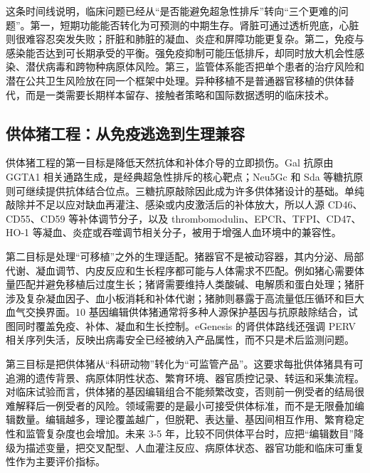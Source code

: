 \documentclass[
  chinese,
  11pt,a4paper]{article}
\begin{document}
这条时间线说明，临床问题已经从``是否能避免超急性排斥''转向``三个更难的问题''。第一，短期功能能否转化为可预测的中期生存。肾脏可通过透析兜底，心脏则很难容忍突发失败；肝脏和肺脏的凝血、炎症和屏障功能更复杂。第二，免疫与感染能否达到可长期承受的平衡。强免疫抑制可能压低排斥，却同时放大机会性感染、潜伏病毒和跨物种病原体风险。第三，监管体系能否把单个患者的治疗风险和潜在公共卫生风险放在同一个框架中处理。异种移植不是普通器官移植的供体替代，而是一类需要长期样本留存、接触者策略和国际数据透明的临床技术\citep{internationalxenotransplantationassociat2, internationalxenotransplantationassociat3}。

\subsection{供体猪工程：从免疫逃逸到生理兼容}\label{ux4f9bux4f53ux732aux5de5ux7a0bux4eceux514dux75abux9003ux9038ux5230ux751fux7406ux517cux5bb9}

供体猪工程的第一目标是降低天然抗体和补体介导的立即损伤。Gal 抗原由 GGTA1
相关通路生成，是经典超急性排斥的核心靶点；Neu5Gc 和 Sda
等糖抗原则可继续提供抗体结合位点。三糖抗原敲除因此成为许多供体猪设计的基础。单纯敲除并不足以应对缺血再灌注、感染或内皮激活后的补体放大，所以人源
CD46、CD55、CD59 等补体调节分子，以及
thrombomodulin、EPCR、TFPI、CD47、HO-1
等凝血、炎症或吞噬调节相关分子，被用于增强人血环境中的兼容性\citep{whatgeneticmodifications2024, geneticengineeringof2022, immunobiologicalbarriersto2023}。

第二目标是处理``可移植''之外的生理适配。猪器官不是被动容器，其内分泌、局部代谢、凝血调节、内皮反应和生长程序都可能与人体需求不匹配。例如猪心需要体量匹配并避免移植后过度生长；猪肾需要维持人类酸碱、电解质和蛋白处理；猪肝涉及复杂凝血因子、血小板消耗和补体代谢；猪肺则暴露于高流量低压循环和巨大血气交换界面。10
基因编辑供体猪通常将多种人源保护基因与抗原敲除结合，试图同时覆盖免疫、补体、凝血和生长控制\citep{specificpathogenfree20251, geneticallyengineeredpig2025}。eGenesis
的肾供体路线还强调 PERV
相关序列失活，反映出病毒安全已经被纳入产品属性，而不只是术后监测问题\citep{egenesis2025egen2784ind}。

第三目标是把供体猪从``科研动物''转化为``可监管产品''。这要求每批供体猪具有可追溯的遗传背景、病原体阴性状态、繁育环境、器官质控记录、转运和采集流程。对临床试验而言，供体猪的基因编辑组合不能频繁改变，否则前一例受者的结局很难解释后一例受者的风险。领域需要的是最小可接受供体标准，而不是无限叠加编辑数量。编辑越多，理论覆盖越广，但脱靶、表达量、基因间相互作用、繁育稳定性和监管复杂度也会增加。未来
3-5
年，比较不同供体平台时，应把``编辑数目''降级为描述变量，把交叉配型、人血灌注反应、病原体状态、器官功能和临床可重复性作为主要评价指标。
\end{document}
